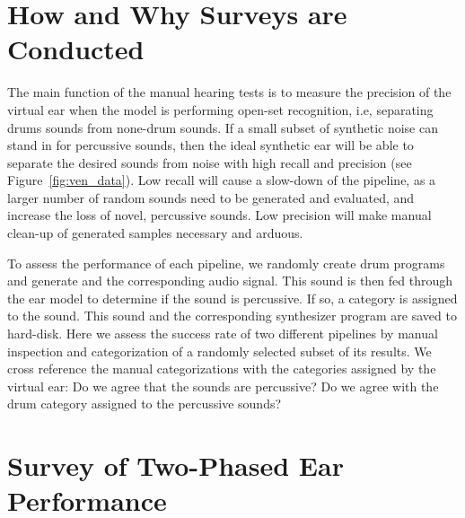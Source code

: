 \documentclass[\main/thesis.tex]{subfiles}
\begin{document}
\label{gens}
\label{surveys}
\section{How and Why Surveys are Conducted}
 
 The main function of the manual hearing tests is to measure the precision of the virtual ear when the model is performing open-set recognition, i.e, separating drums sounds from none-drum sounds. If a small subset of synthetic noise can stand in for percussive sounds, then the ideal synthetic ear will be able to separate the desired sounds from noise with high recall and precision (see Figure~\ref{fig:ven_data}). Low recall will cause a slow-down of the pipeline, as a larger number of random sounds need to be generated and evaluated, and increase the loss of novel, percussive sounds. Low precision will make manual clean-up of generated samples necessary and arduous. 

To assess the performance of each pipeline, we randomly create drum programs and generate and the corresponding audio signal. This sound is then fed through the ear model to determine if the sound is percussive. If so, a category is assigned to the sound. This sound and the corresponding synthesizer program are saved to hard-disk. Here we assess the success rate of two different pipelines by manual inspection and categorization of a randomly selected subset of its results. We cross reference the manual categorizations with the categories assigned by the virtual ear: Do we agree that the sounds are percussive? Do we agree with the drum category assigned to the percussive sounds?
 
 \section{Survey of Two-Phased Ear Performance}
   
\end{document}
